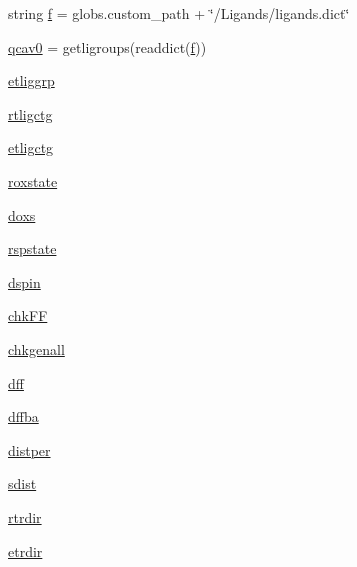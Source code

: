 \begin{DoxyCompactItemize}
\item 
string \hyperlink{classmolSimplify_1_1Classes_1_1mGUI_1_1mGUI_af02780e19ddc99e76e957a880f261732}{f} = globs.\+custom\+\_\+path + \char`\"{}/Ligands/ligands.\+dict\char`\"{}
\item 
\hyperlink{classmolSimplify_1_1Classes_1_1mGUI_1_1mGUI_ab3c458aa120fb1ffddec3463909efe56}{qcav0} = getligroups(readdict(\hyperlink{classmolSimplify_1_1Classes_1_1mGUI_1_1mGUI_a76137d1ef407b43266e051d20d866478}{f}))
\item 
\hyperlink{classmolSimplify_1_1Classes_1_1mGUI_1_1mGUI_a47f3bdd1642db36326d0a6e09ce363b4}{etliggrp}
\item 
\hyperlink{classmolSimplify_1_1Classes_1_1mGUI_1_1mGUI_a5e8a26316ad700a09fddf5f3015878b0}{rtligctg}
\item 
\hyperlink{classmolSimplify_1_1Classes_1_1mGUI_1_1mGUI_af5d161dc2d7a4d26885f05ff52e7abde}{etligctg}
\item 
\hyperlink{classmolSimplify_1_1Classes_1_1mGUI_1_1mGUI_aaa9c7a6b2f23f41fb2eca0ac16503d44}{roxstate}
\item 
\hyperlink{classmolSimplify_1_1Classes_1_1mGUI_1_1mGUI_a909798e74c1cb16c36b1b084cd72c7d2}{doxs}
\item 
\hyperlink{classmolSimplify_1_1Classes_1_1mGUI_1_1mGUI_a3b73fb7e3288ab2ebc2f5fb86706bab7}{rspstate}
\item 
\hyperlink{classmolSimplify_1_1Classes_1_1mGUI_1_1mGUI_a06f99b3f7da66291546eb38924a1f205}{dspin}
\item 
\hyperlink{classmolSimplify_1_1Classes_1_1mGUI_1_1mGUI_ad5be9e55eeafcb464780284897b5f79a}{chk\+FF}
\item 
\hyperlink{classmolSimplify_1_1Classes_1_1mGUI_1_1mGUI_a6e148ad8de4d2de96e4b2d9e6bc9f5a0}{chkgenall}
\item 
\hyperlink{classmolSimplify_1_1Classes_1_1mGUI_1_1mGUI_a4f2de596cbafd563a135c68d0c79ea4b}{dff}
\item 
\hyperlink{classmolSimplify_1_1Classes_1_1mGUI_1_1mGUI_a72c8c62453ac87a66de493e5a91ecaa8}{dffba}
\item 
\hyperlink{classmolSimplify_1_1Classes_1_1mGUI_1_1mGUI_a40448c41f93073c42c1205d22f712bfa}{distper}
\item 
\hyperlink{classmolSimplify_1_1Classes_1_1mGUI_1_1mGUI_a3a7433f6e52eb96f1023964b422da554}{sdist}
\item 
\hyperlink{classmolSimplify_1_1Classes_1_1mGUI_1_1mGUI_a00a062a7d6e9425196a17e1fa7e632fd}{rtrdir}
\item 
\hyperlink{classmolSimplify_1_1Classes_1_1mGUI_1_1mGUI_ac56c7c68609f588f42458d7aa2618a6e}{etrdir}

\end{DoxyCompactItemize}
